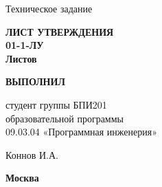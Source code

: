 \vfill

    \textbf{\uppercase{\docTitle}}

    \bigskip

    Техническое задание

    \bigskip

    \textbf{
    	\Large
    		ЛИСТ УТВЕРЖДЕНИЯ \\
    	\large
    		{\docId} 01-1-ЛУ \\
    	\normalsize
    		Листов \pageref*{LastPage}
    }

\vfill

    \makebox[0.45\textwidth]{}\hfil%
    \begin{minipage}[t]{0.45\textwidth}\centering
    	\textbf{ВЫПОЛНИЛ}
            
    	студент группы БПИ201 \\
    	образовательной программы \\
    	09.03.04 «Программная инженерия» \\
    \end{minipage}

\bigskip

    \makebox[0.45\textwidth]{}\hfil%
    \begin{minipage}[t]{0.45\textwidth}\centering
    	\placename Коннов И.А. \\
    	\placedate
    \end{minipage}

\vskip 1.5cm

    \textbf{Москва \YEAR}